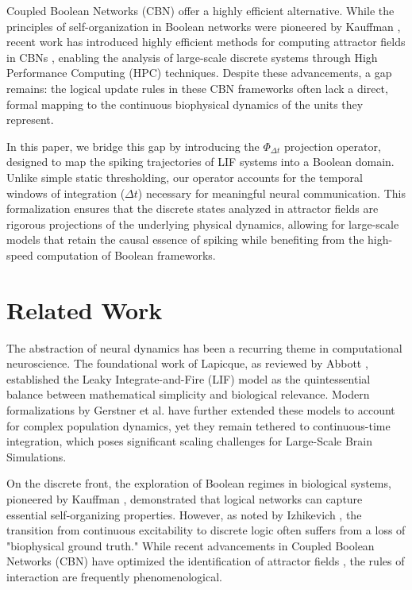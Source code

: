 \documentclass[10pt, conference]{IEEEtran}
\begin{document}
Coupled Boolean Networks (CBN) offer a highly efficient alternative. While the principles of self-organization in Boolean networks were pioneered by Kauffman \cite{kauffman1993origins}, recent work has introduced highly efficient methods for computing attractor fields in CBNs \cite{tovar2022method, rozante2025efficient}, enabling the analysis of large-scale discrete systems through High Performance Computing (HPC) techniques. Despite these advancements, a gap remains: the logical update rules in these CBN frameworks often lack a direct, formal mapping to the continuous biophysical dynamics of the units they represent.

In this paper, we bridge this gap by introducing the $\Phi_{\Delta t}$ projection operator, designed to map the spiking trajectories of LIF systems into a Boolean domain. Unlike simple static thresholding, our operator accounts for the temporal windows of integration ($\Delta t$) necessary for meaningful neural communication. This formalization ensures that the discrete states analyzed in attractor fields \cite{tovar2022method} are rigorous projections of the underlying physical dynamics, allowing for large-scale models that retain the causal essence of spiking while benefiting from the high-speed computation of Boolean frameworks.



\section{Related Work}

The abstraction of neural dynamics has been a recurring theme in computational neuroscience. The foundational work of Lapicque, as reviewed by Abbott \cite{abbott1999lapicque}, established the Leaky Integrate-and-Fire (LIF) model as the quintessential balance between mathematical simplicity and biological relevance. Modern formalizations by Gerstner et al. \cite{gerstner2014neuronal} have further extended these models to account for complex population dynamics, yet they remain tethered to continuous-time integration, which poses significant scaling challenges for Large-Scale Brain Simulations.

On the discrete front, the exploration of Boolean regimes in biological systems, pioneered by Kauffman \cite{kauffman1993origins}, demonstrated that logical networks can capture essential self-organizing properties. However, as noted by Izhikevich \cite{izhikevich2007dynamical}, the transition from continuous excitability to discrete logic often suffers from a loss of "biophysical ground truth." While recent advancements in Coupled Boolean Networks (CBN) have optimized the identification of attractor fields \cite{tovar2022method, rozante2025efficient}, the rules of interaction are frequently phenomenological.
\end{document}

